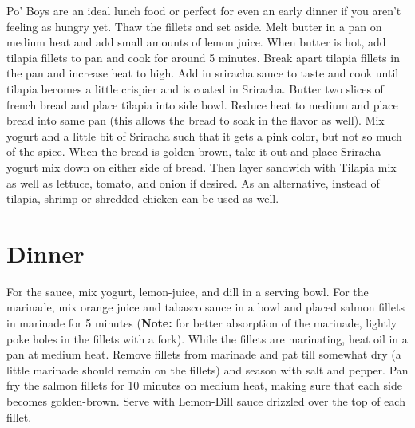 \documentclass[oneside]{recipe}
\begin{document}
Po' Boys are an ideal lunch food or perfect for even an early dinner if you aren't feeling as hungry yet. Thaw the fillets and set aside. Melt butter in a pan on medium heat and add small amounts of lemon juice. When butter is hot, add tilapia fillets to pan and cook for around 5 minutes. Break apart tilapia fillets in the pan and increase heat to high. Add in sriracha sauce to taste and cook until tilapia becomes a little crispier and is coated in Sriracha. Butter two slices of french bread and place tilapia into side bowl. Reduce heat to medium and place bread into same pan (this allows the bread to soak in the flavor as well). Mix yogurt and a little bit of Sriracha such that it gets a pink color, but not so much of the spice. When the bread is golden brown, take it out and place Sriracha yogurt mix down on either side of bread. Then layer sandwich with Tilapia mix as well as lettuce, tomato, and onion if desired. As an alternative, instead of tilapia, shrimp or shredded chicken can be used as well. 

\chapter{Dinner}

For the sauce, mix yogurt, lemon-juice, and dill in a serving bowl. For the marinade, mix orange juice and tabasco sauce in a bowl and placed salmon fillets in marinade for 5 minutes (\textbf{Note:} for better absorption of the marinade, lightly poke holes in the fillets with a fork). While the fillets are marinating, heat oil in a pan at medium heat. Remove fillets from marinade and pat till somewhat dry (a little marinade should remain on the fillets) and season with salt and pepper. Pan fry the salmon fillets for 10 minutes on medium heat, making sure that each side becomes golden-brown. Serve with Lemon-Dill sauce drizzled over the top of each fillet. 

\end{document}
